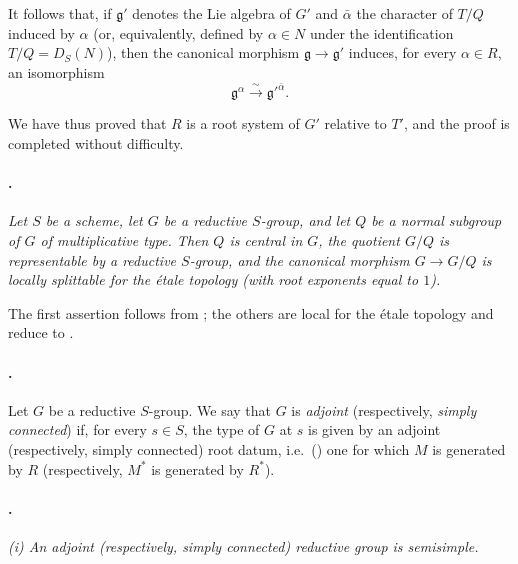 It follows that, if \(\mathfrak g'\) denotes the Lie algebra of
\(G'\) and \(\bar\alpha\) the character of \(T/Q\) induced by
\(\alpha\) \textup{(or, equivalently, defined by \(\alpha\in N\)
under the identification \(T/Q=D_S(N)\))}, then the canonical
morphism \(\mathfrak g\to\mathfrak g'\) induces, for every
\(\alpha\in R\), an isomorphism
\[
  \mathfrak g^\alpha
  \xrightarrow{\ \sim\ }
  \mathfrak g'^{\bar\alpha}.
\]

We have thus proved that \(R\) is a root system of \(G'\) relative
to \(T'\), and the proof is completed without difficulty.

\paragraph{.}
\textit{Let \(S\) be a scheme, let \(G\) be a reductive
\(S\)-group, and let \(Q\) be a normal subgroup of \(G\) of
multiplicative type. Then \(Q\) is central in \(G\), the quotient
\(G/Q\) is representable by a reductive \(S\)-group, and the
canonical morphism \(G\to G/Q\) is locally splittable for the
étale topology \textup{(with root exponents equal to \(1\))}.}

The first assertion follows from ; the others are
local for the étale topology and reduce to .

\paragraph{.}
Let \(G\) be a reductive \(S\)-group. We say that \(G\) is
\emph{adjoint} \textup{(respectively, \emph{simply connected})} if,
for every \(s\in S\), the type of \(G\) at \(s\) is given by an
adjoint \textup{(respectively, simply connected)} root datum, i.e.\
\textup{()} one for which \(M\) is generated by
\(R\) \textup{(respectively, \(M^*\) is generated by \(R^*\))}.

\paragraph{.}
\textit{\textup{\SGAInlineRefTarget{sga3:xxii:prop:4.3.4:item:i}(i)} An adjoint \textup{(respectively, simply
connected)} reductive group is semisimple.}

